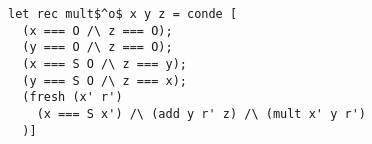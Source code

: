 \begin{figure}[!t]
  \centering
  \begin{minipage}{\columnwidth}
    \begin{lstlisting}[label={mult}, caption={Multiplication relation}, captionpos=b, frame=tb]
let rec mult$^o$ x y z = conde [
  (x === O /\ z === O);
  (y === O /\ z === O);
  (x === S O /\ z === y);
  (y === S O /\ z === x);
  (fresh (x' r')
    (x === S x') /\ (add y r' z) /\ (mult x' y r')
  )]
    \end{lstlisting}
  \end{minipage}
\end{figure}
